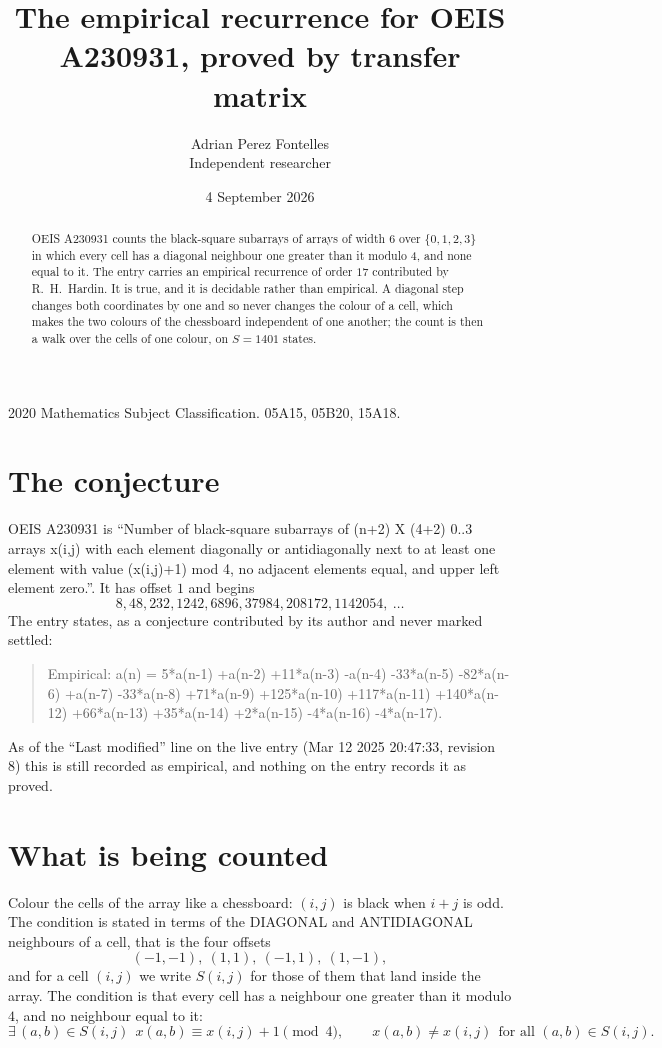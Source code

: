\documentclass[11pt,a4paper]{article}
\title{The empirical recurrence for OEIS A230931, proved by transfer matrix}
\author{Adrian Perez Fontelles\\ \small Independent researcher}
\date{4 September 2026}
\theoremstyle{plain}
\theoremstyle{definition}
\begin{document}
\maketitle

\begin{abstract}
OEIS A230931 counts the black-square subarrays of arrays of width $6$ over $\{0,1,2,3\}$ in which
every cell has a diagonal neighbour one greater than it modulo 4, and none equal to it. The entry carries an empirical recurrence of order $17$ contributed by
R.~H.~Hardin. It is true, and it is decidable rather than empirical. A diagonal step changes
both coordinates by one and so never changes the colour of a cell, which makes the two colours
of the chessboard independent of one another; the count is then a walk over the cells of one
colour, on $S=1401$ states.
\end{abstract}

\noindent\small 2020 Mathematics Subject Classification. 05A15, 05B20, 15A18.\normalsize

\section{The conjecture}

OEIS A230931 is ``Number of black-square subarrays of (n+2) X (4+2) 0..3 arrays x(i,j) with each element diagonally or antidiagonally next to at least one element with value (x(i,j)+1) mod 4, no adjacent elements equal, and upper left element zero.''. It has offset $1$ and begins
\[
8, 48, 232, 1242, 6896, 37984, 208172, 1142054,\ \dots
\]
The entry states, as a conjecture contributed by its author and never marked settled:
\begin{quote}
Empirical: a(n) = 5*a(n-1) +a(n-2) +11*a(n-3) -a(n-4) -33*a(n-5) -82*a(n-6) +a(n-7) -33*a(n-8) +71*a(n-9) +125*a(n-10) +117*a(n-11) +140*a(n-12) +66*a(n-13) +35*a(n-14) +2*a(n-15) -4*a(n-16) -4*a(n-17).
\end{quote}
As of the ``Last modified'' line on the live entry (Mar 12 2025 20:47:33, revision 8) this is still
recorded as empirical, and nothing on the entry records it as proved.

\section{What is being counted}

Colour the cells of the array like a chessboard: $(i,j)$ is black when $i+j$ is odd. The
condition is stated in terms of the DIAGONAL and ANTIDIAGONAL neighbours of a cell, that is the
four offsets
\[
(-1,-1),\ (1,1),\ (-1,1),\ (1,-1),
\]
and for a cell $(i,j)$ we write $S(i,j)$ for those of them that land inside the array. The
condition is that every cell has a neighbour one greater than it modulo $4$, and no neighbour equal to it:
\[
\exists\,(a,b)\in S(i,j)\ \ x(a,b)\equiv x(i,j)+1 \!\!\pmod{4},\qquad x(a,b)\neq x(i,j)\ \ \text{for all }(a,b)\in S(i,j).
\]
\end{document}
